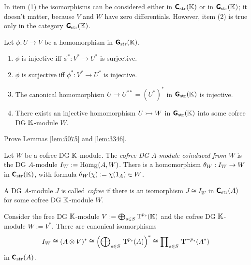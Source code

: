 In item (1) the isomorphisms can be considered either in 
$\boldsymbol{\mathsf{C}}_{\mathrm{str}}(\mathbb{K})$ or in $\boldsymbol{\mathsf{G}}_{\mathrm{str}}(\mathbb{K})$; it doesn't matter, 
because $V$ and $W$ have zero differentials. However, item (2) is true only in 
the category $\boldsymbol{\mathsf{G}}_{\mathrm{str}}(\mathbb{K})$.

\begin{lem} \label{lem:3346}
Let $\phi : U \to V$ be a homomorphism in $\boldsymbol{\mathsf{G}}_{\mathrm{str}}(\mathbb{K})$. 
\begin{enumerate}
\item $\phi$ is injective iff $\phi^* : V^* \to U^*$ is surjective. 

\item $\phi$ is surjective iff $\phi^* : V^* \to U^*$ is injective.

\item The canonical homomorphism $U \to U^{**} = (U^*)^*$ in 
$\boldsymbol{\mathsf{G}}_{\mathrm{str}}(\mathbb{K})$ is injective. 

\item There exists an injective homomorphism 
$U \rightarrowtail W$ in $\boldsymbol{\mathsf{G}}_{\mathrm{str}}(\mathbb{K})$
into some cofree DG $\mathbb{K}$-module $W$. 
\end{enumerate}
\end{lem}

\begin{exer}
Prove Lemmas \ref{lem:5075} and \ref{lem:3346}. 
\end{exer}

\begin{dfn} \label{dfn:3345}
Let $W$ be a cofree DG $\mathbb{K}$-module. The {\em cofree DG $A$-module coinduced 
from $W$} is the DG $A$-module
$I_W :=  \operatorname{Hom}_{\mathbb{K}}(A, W)$.
There is a homomorphism $\theta_W : I_W \to W$
in $\boldsymbol{\mathsf{C}}_{\mathrm{str}}(\mathbb{K})$, with formula 
$\theta_W(\chi) := \chi(1_A) \in W$. 
\end{dfn}

\begin{dfn} \label{dfn:3346}
A DG $A$-module $J$ is called {\em cofree}%
if there is an isomorphism 
$J \cong I_W$ in $\boldsymbol{\mathsf{C}}_{\mathrm{str}}(A)$ for some cofree DG $\mathbb{K}$-module 
$W$. 
\end{dfn}

\begin{lem} \label{lem:3345}
Consider the free DG $\mathbb{K}$-module 
$V := \bigoplus\nolimits_{s \in S} \operatorname{T}^{p_s} (\mathbb{K})$
and the cofree DG $\mathbb{K}$-module 
$W := V^*$. There are canonical isomorphisms 
\[ I_W \cong (A \otimes V)^* \cong
\Bigl( \bigoplus\nolimits_{s \in S} \, \operatorname{T}^{p_s} (A) \Bigr)^*
\cong \prod\nolimits_{s \in S} \, \operatorname{T}^{-p_s} (A^*) \]
in $\boldsymbol{\mathsf{C}}_{\mathrm{str}}(A)$.
\end{lem}

